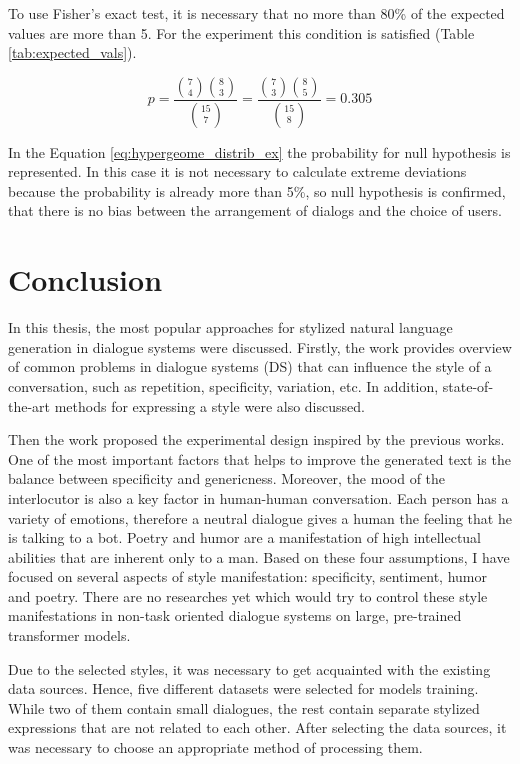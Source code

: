 To use Fisher's exact test, it is necessary that no more than 80\% of the expected values are more than 5. For the experiment this condition is satisfied (Table \ref{tab:expected_vals}).

\begin{equation} \label{eq:hypergeome_distrib_ex}
p = \frac{\binom{7}{4} \binom{8}{3}}{\binom{15}{7}} = \frac{\binom{7}{3} \binom{8}{5}}{\binom{15}{8}} = 0.305
\end{equation}

In the Equation \ref{eq:hypergeome_distrib_ex} the probability for null hypothesis is represented. In this case it is not necessary to calculate extreme deviations because the probability is already more than 5\%, so null hypothesis is confirmed, that there is no bias between the arrangement of dialogs and the choice of users.
\chapter{Conclusion} \label{conclusion}
In this thesis, the most popular approaches for stylized natural language generation in dialogue systems were discussed. Firstly, the work provides overview of common problems in dialogue systems (DS) that can influence the style of a conversation, such as repetition, specificity, variation, etc. In addition, state-of-the-art methods for expressing a style were also discussed.

Then the work proposed the experimental design inspired by the previous works. One of the most important factors that helps to improve the generated text is the balance between specificity and genericness. Moreover, the mood of the interlocutor is also a key factor in human-human conversation. Each person has a variety of emotions, therefore a neutral dialogue gives a human the feeling that he is talking to a bot. Poetry and humor are a manifestation of high intellectual abilities that are inherent only to a man. Based on these four assumptions, I have focused on several aspects of style manifestation: specificity, sentiment, humor and poetry. There are no researches yet which would try to control these style manifestations in non-task oriented dialogue systems on large, pre-trained transformer models. 

Due to the selected styles, it was necessary to get acquainted with the existing data sources. Hence, five different datasets were selected for models training. While two of them contain small dialogues, the rest contain separate stylized expressions that are not related to each other. After selecting the data sources, it was necessary to choose an appropriate method of processing them.

